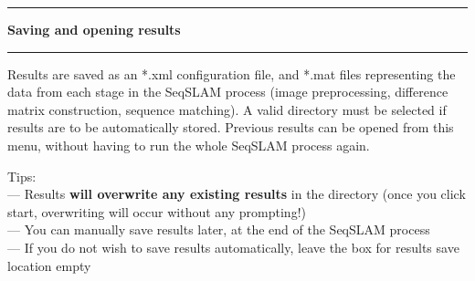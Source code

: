 \noindent\rule{\textwidth}{1pt}
\indent \textbf{Saving and opening results}
\noindent\rule{\textwidth}{1pt}
\smallskip
\parbox{\textwidth}{Results are saved as an *.xml configuration file, and *.mat files representing the data from each stage in the SeqSLAM process (image preprocessing, difference matrix construction, sequence matching). A valid directory must be selected if results are to be automatically stored. Previous results can be opened from this menu, without having to run the whole SeqSLAM process again.}
\bigskip
\parbox{\textwidth}{Tips: \\ --- Results \textbf{will overwrite any existing results} in the directory (once you click start, overwriting will occur without any prompting!) \\ --- You can manually save results later, at the end of the SeqSLAM process \\ --- If you do not wish to save results automatically, leave the box for results save location empty}
\smallskip
